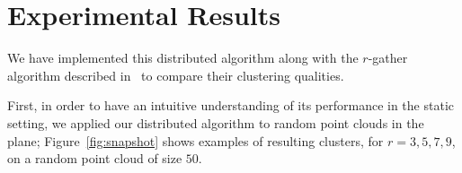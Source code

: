 
\section{Experimental Results}


We have implemented this distributed algorithm along with the $r$-gather algorithm described in~\cite{Aggarwal06achievinganonymity} to compare their clustering qualities. 


First, in order to have an intuitive understanding of its performance in the static setting, we applied our distributed algorithm to random point clouds in the plane; Figure~\ref{fig:snapshot} shows examples of resulting clusters, for $r=3,5,7,9$, on a random point cloud of size $50$.


